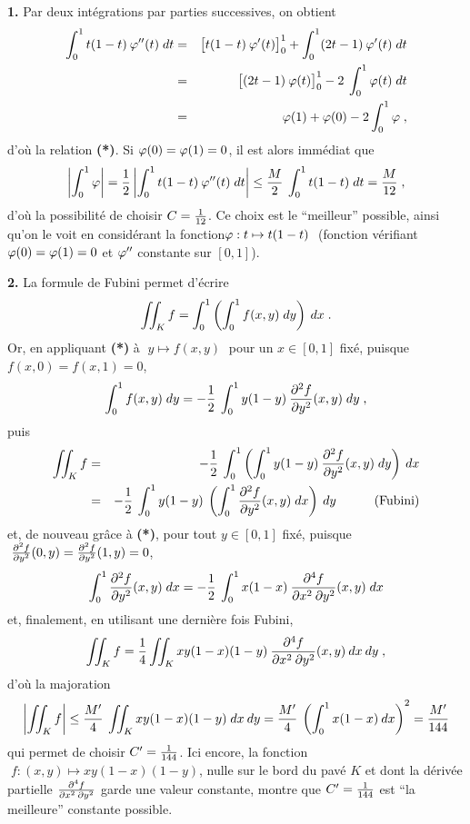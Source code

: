 \documentclass{article}
\begin{document}
{\bf 1.} Par deux int\'egrations par parties successives, on obtient\vv
\begin{eqnarray*}
\int_0^1t(1-t)\>\varphi''(t)\;dt & = & \big[t(1-t)\>\varphi'(t)\big]_0^1
                                             +\int_0^1(2t-1)\>\varphi'(t)\;dt\\
                                         & = & \big[(2t-1)\>\varphi(t)\big]_0^1-
                                             2\>\int_0^1\varphi(t)\;dt\\
                                         & = & \varphi(1)+\varphi(0)-2\int_0^1\varphi
                                             \;,
\end{eqnarray*}
d'o\`u la relation {\bf (*)}. Si $\varphi(0)=\varphi(1)=0$, il est alors imm\'ediat
que\vv
$$\left|\int_0^1\varphi\right|={1\over2}\left|\int_0^1t(1-t)\>\varphi''(t)\;dt\right|
  \le{M\over2}\>\int_0^1t(1-t)\;dt={M\over12}\;,$$
d'o\`u la possibilit\'e de choisir $C={1\over12}$.\pn
Ce choix est le ``meilleur'' possible, ainsi qu'on le voit en consid\'erant la
fonction\break $\varphi:t\mapsto t(1-t)\;$ (fonction v\'erifiant $\varphi(0)=\varphi(1)=0$ et
$\varphi''$ constante sur $[0,1]$).

\msk
{\bf 2.} La formule de Fubini permet d'\'ecrire\vv
$$\int\!\!\!\int_Kf=\int_0^1\left(\int_0^1f(x,y)\;dy\right)\>dx\;.$$
Or, en appliquant {\bf (*)} \`a $\;y\mapsto f(x,y)\;$ pour un $x\in[0,1]$
fix\'e, puisque $f(x,0)=f(x,1)=0$,\vv
$$\int_0^1f(x,y)\;dy=-{1\over2}\>\int_0^1y(1-y)\>{\partial^2f\over\partial y^2}(x,y)\;dy
  \;,$$
puis\vv
\begin{eqnarray*}
\int\!\!\!\int_Kf & = & -{1\over2}\>\int_0^1\left(\int_0^1y(1-y)\>{\partial^2f\over
                            \partial y^2}(x,y)\;dy\right)\>dx\\
                    & = & -{1\over2}\>\int_0^1y(1-y)\>\left(\int_0^1
                            {\partial^2f\over\partial y^2}(x,y)\;dx\right)\>dy\qquad\quad
                            \hbox{(Fubini)}
\end{eqnarray*}
et, de nouveau gr\^ace \`a {\bf (*)}, pour tout $y\in[0,1]$ fix\'e, puisque
$\;{\partial^2f\over\partial y^2}(0,y)={\partial^2f\over\partial y^2}(1,y)=0$,\vv
$$\int_0^1{\partial^2f\over\partial y^2}(x,y)\;dx=-{1\over2}\>\int_0^1x(1-x)\>
  {\partial^4f\over\partial x^2\>\partial y^2}(x,y)\;dx$$
et, finalement, en utilisant une derni\`ere fois Fubini,\vv
$$\int\!\!\!\int_Kf={1\over4}\int\!\!\!\int_Kxy(1-x)(1-y)\>{\partial^4f\over\partial x^2\>\partial y^2}(x,y)
  \>dx\>dy\;,$$
d'o\`u la majoration\vv
$$\left|\int\!\!\!\int_Kf\right|\le{M'\over4}\>\int\!\!\!\int_Kxy(1-x)(1-y)\;dx\>dy={M'\over4}\>
  \left(\int_0^1x(1-x)\>dx\right)^2={M'\over144}$$
qui permet de choisir $C'={1\over144}$. Ici encore, la fonction $\;f:(x,y)
\mapsto xy(1-x)(1-y)$, nulle sur le bord du pav\'e $K$ et dont la d\'eriv\'ee
partielle ${\partial^4f\over\partial x^2\>\partial y^2}$ garde une valeur constante, montre
que $C'={1\over144}$ est ``la meilleure'' constante possible.
\end{document}
